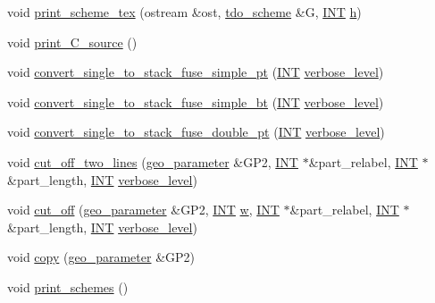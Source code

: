 \begin{DoxyCompactItemize}
void \mbox{\hyperlink{classgeo__parameter_a104c98d07fca47339b49c9acb42e5efe}{print\+\_\+scheme\+\_\+tex}} (ostream \&ost, \mbox{\hyperlink{classtdo__scheme}{tdo\+\_\+scheme}} \&G, \mbox{\hyperlink{galois_8h_a09fddde158a3a20bd2dcadb609de11dc}{I\+NT}} \mbox{\hyperlink{alphabet2_8_c_a16611451551e3d15916bae723c3f59f7}{h}})
\item 
void \mbox{\hyperlink{classgeo__parameter_adaabcb412bef1d21a8233b9df671a178}{print\+\_\+\+C\+\_\+source}} ()
\item 
void \mbox{\hyperlink{classgeo__parameter_a55bfef2de6f778f98dc6556db7ca09f0}{convert\+\_\+single\+\_\+to\+\_\+stack\+\_\+fuse\+\_\+simple\+\_\+pt}} (\mbox{\hyperlink{galois_8h_a09fddde158a3a20bd2dcadb609de11dc}{I\+NT}} \mbox{\hyperlink{simeon_8_c_a818073fbcc2f439e7c56952f67386122}{verbose\+\_\+level}})
\item 
void \mbox{\hyperlink{classgeo__parameter_a0cf3cd58d64429f34e0d332873df8ce0}{convert\+\_\+single\+\_\+to\+\_\+stack\+\_\+fuse\+\_\+simple\+\_\+bt}} (\mbox{\hyperlink{galois_8h_a09fddde158a3a20bd2dcadb609de11dc}{I\+NT}} \mbox{\hyperlink{simeon_8_c_a818073fbcc2f439e7c56952f67386122}{verbose\+\_\+level}})
\item 
void \mbox{\hyperlink{classgeo__parameter_a5932c348cab6747ce94d2eeb7a1c40b0}{convert\+\_\+single\+\_\+to\+\_\+stack\+\_\+fuse\+\_\+double\+\_\+pt}} (\mbox{\hyperlink{galois_8h_a09fddde158a3a20bd2dcadb609de11dc}{I\+NT}} \mbox{\hyperlink{simeon_8_c_a818073fbcc2f439e7c56952f67386122}{verbose\+\_\+level}})
\item 
void \mbox{\hyperlink{classgeo__parameter_a4a8521129ea64b169d26abf5ff0ce0d9}{cut\+\_\+off\+\_\+two\+\_\+lines}} (\mbox{\hyperlink{classgeo__parameter}{geo\+\_\+parameter}} \&G\+P2, \mbox{\hyperlink{galois_8h_a09fddde158a3a20bd2dcadb609de11dc}{I\+NT}} $\ast$\&part\+\_\+relabel, \mbox{\hyperlink{galois_8h_a09fddde158a3a20bd2dcadb609de11dc}{I\+NT}} $\ast$\&part\+\_\+length, \mbox{\hyperlink{galois_8h_a09fddde158a3a20bd2dcadb609de11dc}{I\+NT}} \mbox{\hyperlink{simeon_8_c_a818073fbcc2f439e7c56952f67386122}{verbose\+\_\+level}})
\item 
void \mbox{\hyperlink{classgeo__parameter_a88ddcdf4c59071a89cae32add3747759}{cut\+\_\+off}} (\mbox{\hyperlink{classgeo__parameter}{geo\+\_\+parameter}} \&G\+P2, \mbox{\hyperlink{galois_8h_a09fddde158a3a20bd2dcadb609de11dc}{I\+NT}} \mbox{\hyperlink{alphabet2_8_c_aac374e320caaadeca4874add33b62af2}{w}}, \mbox{\hyperlink{galois_8h_a09fddde158a3a20bd2dcadb609de11dc}{I\+NT}} $\ast$\&part\+\_\+relabel, \mbox{\hyperlink{galois_8h_a09fddde158a3a20bd2dcadb609de11dc}{I\+NT}} $\ast$\&part\+\_\+length, \mbox{\hyperlink{galois_8h_a09fddde158a3a20bd2dcadb609de11dc}{I\+NT}} \mbox{\hyperlink{simeon_8_c_a818073fbcc2f439e7c56952f67386122}{verbose\+\_\+level}})
\item 
void \mbox{\hyperlink{classgeo__parameter_aa1345dc9b7647a3831848debcd583d3a}{copy}} (\mbox{\hyperlink{classgeo__parameter}{geo\+\_\+parameter}} \&G\+P2)
\item 
void \mbox{\hyperlink{classgeo__parameter_a40ece8eb12f3eeff37e420100551fc80}{print\+\_\+schemes}} ()
\end{DoxyCompactItemize}
